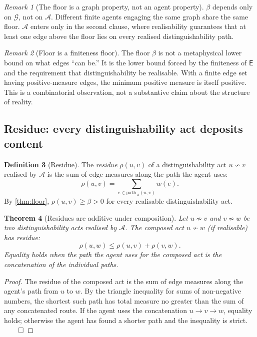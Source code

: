 \documentclass[11pt,a4paper]{article}
\theoremstyle{thmstyle}
\newtheorem{theorem}{Theorem}[section]
\theoremstyle{definition}
\newtheorem{definition}[theorem]{Definition}
\theoremstyle{remark}
\newtheorem{remark}[theorem]{Remark}
\newcommand{\Graph}{\mathcal{G}}
\newcommand{\Edg}{\mathsf{E}}
\newcommand{\Agent}{\mathcal{A}}
\newcommand{\Res}{\rho}
\newcommand{\floor}{\beta}
\begin{document}
\begin{remark}[The floor is a graph property, not an agent
property]
\label{rem:floor_graph_property}
$\floor$ depends only on $\Graph$, not on $\Agent$. Different
finite agents engaging the same graph share the same floor.
$\Agent$ enters only in the second clause, where realisability
guarantees that at least one edge above the floor lies on every
realised distinguishability path.
\end{remark}

\begin{remark}[Floor is a finiteness floor]
\label{rem:floor_is_finiteness}
The floor $\floor$ is not a metaphysical lower bound on what edges
``can be.'' It is the lower bound forced by the finiteness of
$\Edg$ and the requirement that distinguishability be realisable.
With a finite edge set having positive-measure edges, the minimum
positive measure is itself positive. This is a combinatorial
observation, not a substantive claim about the structure of
reality.
\end{remark}

\subsection{Residue: every distinguishability act deposits content}

\begin{definition}[Residue]
\label{def:residue}
The \emph{residue} $\Res(u,v)$ of a distinguishability act
$u \not\sim v$ realised by $\Agent$ is the sum of edge measures
along the path the agent uses:
\[
  \Res(u,v) = \sum_{e \in \mathrm{path}_\Agent(u,v)} w(e).
\]
By \cref{thm:floor}, $\Res(u,v) \geq \floor > 0$ for every
realisable distinguishability act.
\end{definition}

\begin{theorem}[Residues are additive under composition]
\label{thm:residue_additive}
Let $u \not\sim v$ and $v \not\sim w$ be two distinguishability
acts realised by $\Agent$. The composed act $u \not\sim w$ (if
realisable) has residue:
\[
  \Res(u, w) \leq \Res(u, v) + \Res(v, w).
\]
Equality holds when the path the agent uses for the composed act is
the concatenation of the individual paths.
\end{theorem}

\begin{proof}
The residue of the composed act is the sum of edge measures along
the agent's path from $u$ to $w$. By the triangle inequality for
sums of non-negative numbers, the shortest such path has total
measure no greater than the sum of any concatenated route. If the
agent uses the concatenation $u \to v \to w$, equality holds;
otherwise the agent has found a shorter path and the inequality is
strict. $\qed$
\end{proof}
\end{document}
